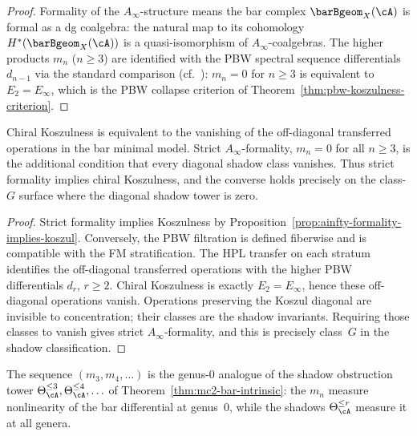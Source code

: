 \begin{proof}
Formality of the $A_\infty$-structure means the bar complex
$\barBgeom_X(\cA)$ is formal as a dg coalgebra: the natural map to
its cohomology $H^*(\barBgeom_X(\cA))$ is a quasi-isomorphism of
$A_\infty$-coalgebras. The higher products $m_n$ ($n \geq 3$) are
identified with the PBW spectral sequence differentials $d_{n-1}$
via the standard comparison (cf.\ \cite[Theorem~3.4.1]{LPWZ09}):
$m_n = 0$ for $n \geq 3$ is equivalent to $E_2 = E_\infty$, which
is the PBW collapse criterion of
Theorem~\ref{thm:pbw-koszulness-criterion}.
\end{proof}

\begin{theorem}
\label{thm:ainfty-koszul-characterization}%

Chiral Koszulness is equivalent to the vanishing of the off-diagonal
transferred operations in the bar minimal model. Strict
$A_\infty$-formality, $m_n=0$ for all $n\geq3$, is the additional
condition that every diagonal shadow class vanishes. Thus strict
formality implies chiral Koszulness, and the converse holds precisely
on the class-$G$ surface where the diagonal shadow tower is zero.
\end{theorem}

\begin{proof}
Strict formality implies Koszulness by
Proposition~\ref{prop:ainfty-formality-implies-koszul}. Conversely,
the PBW filtration is defined fiberwise and is compatible with the FM
stratification. The HPL transfer on each stratum identifies the
off-diagonal transferred operations with the higher PBW differentials
$d_r$, $r\geq2$. Chiral Koszulness is exactly $E_2=E_\infty$, hence
these off-diagonal operations vanish. Operations preserving the Koszul
diagonal are invisible to concentration; their classes are the shadow
invariants. Requiring those classes to vanish gives strict
$A_\infty$-formality, and this is precisely class~$G$ in the shadow
classification.
\end{proof}

\begin{remark}
\label{rem:ainfty-genus0-shadow}

The sequence $(m_3, m_4, \ldots)$ is the genus-$0$ analogue of the
shadow obstruction tower $\Theta_\cA^{\leq 3}, \Theta_\cA^{\leq 4},
\ldots$ of Theorem~\ref{thm:mc2-bar-intrinsic}: the $m_n$ measure
nonlinearity of the bar differential at genus~$0$, while the shadows
$\Theta_\cA^{\leq r}$ measure it at all genera.
\end{remark}

